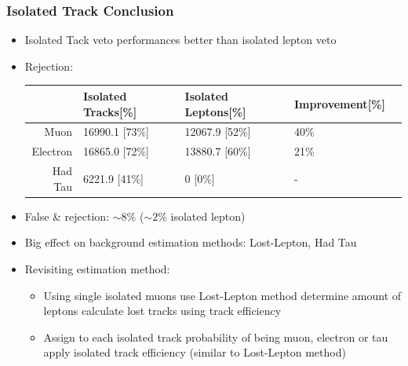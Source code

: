 \documentclass{beamer}
\begin{document}
\begin{frame}
\frametitle{Isolated Track Conclusion}
\begin{itemize}
 \item Isolated Tack veto performances better than isolated lepton veto
 \item Rejection:
  \begin{tabular}{|r|l|l|l|l}
        \hline
                     & Isolated Tracks[\%]    & Isolated Leptons[\%] & Improvement[\%]     \\  \hline
        Muon         &16990.1  [73\%]           & 12067.9 [52\%]         &40\%              \\
        Electron     &16865.0 [72\%]           & 13880.7 [60\%]        &21\%            \\
        Had Tau      &6221.9 [41\%]            & 0 [0\%]                &-           \\
        \hline
    \end{tabular}
 \item False \ttbar \& \wpj rejection: $\sim 8\%$ ($\sim 2\%$ isolated lepton)
 \item Big effect on background estimation methods: Lost-Lepton, Had Tau
 \item Revisiting estimation method:
 \begin{itemize}
  \item Using single isolated muons use Lost-Lepton method determine amount of leptons calculate lost tracks using track efficiency
  \item Assign to each isolated track probability of being muon, electron or tau apply isolated track efficiency (similar to Lost-Lepton method)
 \end{itemize}


\end{itemize}

\end{frame}

\section{\ZInvJets}
\begin{frame}
  \begin{center}
    \huge\ZInvJets
    
  \end{center}
\end{frame}
\end{document}
